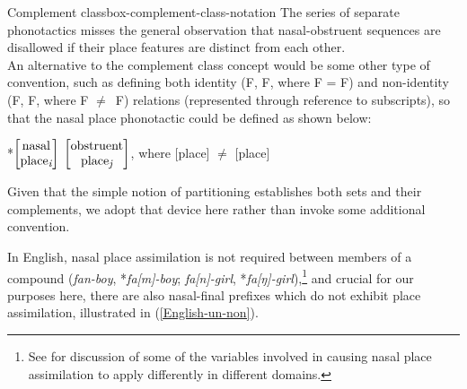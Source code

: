 \begin{dadpbox}{Complement class}{box-complement-class-notation}
\noindent The series of separate phonotactics misses the general observation that nasal-obstruent sequences are disallowed if their place features are distinct from each other.\\

An alternative to the complement class concept would be some other type of convention, such as defining both identity (F, F, where {F = F}) and non-identity (F, F, where {F $\neq$\ F}) relations (represented through reference to subscripts), so that the nasal place phonotactic could be defined as shown below:\begin{center}*$\begin{bmatrix}\textrm{nasal}\\\textrm{place\ensuremath{_{\textrm{\footnotesize{\it i}}}}}\end{bmatrix}$ $\begin{bmatrix}\textrm{obstruent}\\\textrm{place\ensuremath{_{\textrm{\footnotesize{\it j}}}}}\end{bmatrix}$, where {[place]} $\neq$ [place] \end{center} Given that the simple notion of partitioning establishes both sets and their complements, we adopt that device here rather than invoke some additional convention.
\end{dadpbox}

\largerpage
In English, nasal place assimilation is not required between members of a compound ({\it fan-boy}, *{\it fa[m]-boy}; {\it fa[n]-girl}, *{\it fa[ŋ]-girl}),\footnote{See \citet{Mohanan:1993} for discussion of some of the variables involved in causing nasal place assimilation to apply differently in different domains.} and crucial for our purposes here, there are also nasal-final prefixes which do not exhibit place assimilation,  illustrated in (\ref{English-un-non}).

